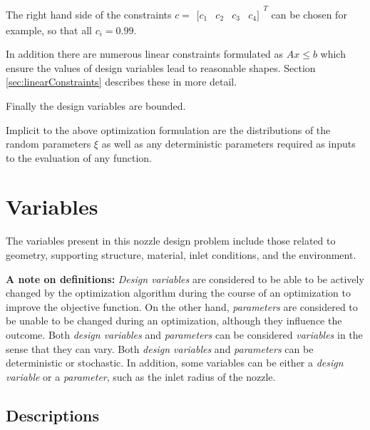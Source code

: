 \documentclass{article}
\newcommand{\irow}[1]{%
  \begin{smallmatrix}[#1]\end{smallmatrix}%
}
\begin{document}
The right hand side of the constraints $c = \irow{c_1 & c_2 & c_3 & c_4 }^T$ can be chosen for example, so that all $c_i = 0.99$.

In addition there are numerous linear constraints formulated as $A x \leq b$ which ensure the values of design variables lead to reasonable shapes. Section \ref{sec:linearConstraints} describes these in more detail.

Finally the design variables are bounded.

Implicit to the above optimization formulation are the distributions of the random parameters $\xi$ as well as any deterministic parameters required as inputs to the evaluation of any function.

\section{Variables}

The variables present in this nozzle design problem include those related to geometry, supporting structure, material, inlet conditions, and the environment.

\begin{mdframed}
\textbf{A note on definitions:} \textit{Design variables} are considered to be able to be actively changed by the optimization algorithm during the course of an optimization to improve the objective function. On the other hand, \textit{parameters} are considered to be unable to be changed during an optimization, although they influence the outcome. Both \textit{design variables} and \textit{parameters} can be considered \textit{variables} in the sense that they can vary. Both \textit{design variables} and \textit{parameters} can be deterministic or stochastic. In addition, some variables can be either a \textit{design variable} or a \textit{parameter}, such as the inlet radius of the nozzle.
\end{mdframed}

\subsection{Descriptions}
\end{document}
